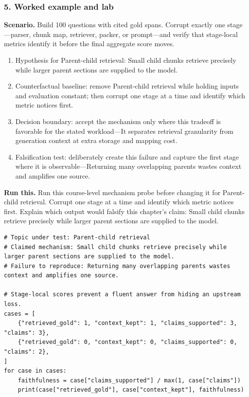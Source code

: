 \subsubsection*{5. Worked example and lab}
\textbf{Scenario.} Build 100 questions with cited gold spans. Corrupt exactly one stage—parser, chunk map, retriever, packer, or prompt—and verify that stage-local metrics identify it before the final aggregate score moves.
\begin{enumerate}
\item Hypothesis for Parent-child retrieval: Small child chunks retrieve precisely while larger parent sections are supplied to the model.
\item Counterfactual baseline: remove Parent-child retrieval while holding inputs and evaluation constant; then corrupt one stage at a time and identify which metric notices first.
\item Decision boundary: accept the mechanism only where this tradeoff is favorable for the stated workload—It separates retrieval granularity from generation context at extra storage and mapping cost.
\item Falsification test: deliberately create this failure and capture the first stage where it is observable—Returning many overlapping parents wastes context and amplifies one source.
\end{enumerate}
\textbf{Run this.} Run this course-level mechanism probe before changing it for Parent-child retrieval. Corrupt one stage at a time and identify which metric notices first. Explain which output would falsify this chapter's claim: Small child chunks retrieve precisely while larger parent sections are supplied to the model.
\begin{Verbatim}[fontsize=\scriptsize]
# Topic under test: Parent-child retrieval
# Claimed mechanism: Small child chunks retrieve precisely while larger parent sections are supplied to the model.
# Failure to reproduce: Returning many overlapping parents wastes context and amplifies one source.

# Stage-local scores prevent a fluent answer from hiding an upstream loss.
cases = [
    {"retrieved_gold": 1, "context_kept": 1, "claims_supported": 3, "claims": 3},
    {"retrieved_gold": 0, "context_kept": 0, "claims_supported": 0, "claims": 2},
]
for case in cases:
    faithfulness = case["claims_supported"] / max(1, case["claims"])
    print(case["retrieved_gold"], case["context_kept"], faithfulness)
\end{Verbatim}
